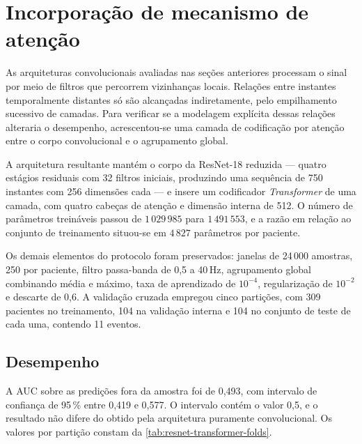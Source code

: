 
\section{Incorporação de mecanismo de atenção}
\label{sec:resultados-resnet18-transformer}

As arquiteturas convolucionais avaliadas nas seções anteriores processam o
sinal por meio de filtros que percorrem vizinhanças locais. Relações entre
instantes temporalmente distantes só são alcançadas indiretamente, pelo
empilhamento sucessivo de camadas. Para verificar se a modelagem explícita
dessas relações alteraria o desempenho, acrescentou-se uma camada de
codificação por atenção entre o corpo convolucional e o agrupamento global.

A arquitetura resultante mantém o corpo da ResNet-18 reduzida --- quatro
estágios residuais com 32 filtros iniciais, produzindo uma sequência de 750
instantes com 256 dimensões cada --- e insere um codificador \textit{Transformer}
de uma camada, com quatro cabeças de atenção e dimensão interna de 512. O
número de parâmetros treináveis passou de $1\,029\,985$ para $1\,491\,553$, e
a razão em relação ao conjunto de treinamento situou-se em $4\,827$
parâmetros por paciente.

Os demais elementos do protocolo foram preservados: janelas de 24\,000
amostras, 250 por paciente, filtro passa-banda de 0,5 a 40\,Hz, agrupamento
global combinando média e máximo, taxa de aprendizado de $10^{-4}$,
regularização de $10^{-2}$ e descarte de 0,6. A validação cruzada empregou
cinco partições, com 309 pacientes no treinamento, 104 na validação interna e
104 no conjunto de teste de cada uma, contendo 11 eventos.

\subsection{Desempenho}
\label{subsec:desempenho-resnet18-transformer}

A \gls{AUC} sobre as predições fora da amostra foi de 0,493, com intervalo de
confiança de 95\,\% entre 0,419 e 0,577. O intervalo contém o valor 0,5, e o
resultado não difere do obtido pela arquitetura puramente convolucional. Os
valores por partição constam da \autoref{tab:resnet-transformer-folds}.

